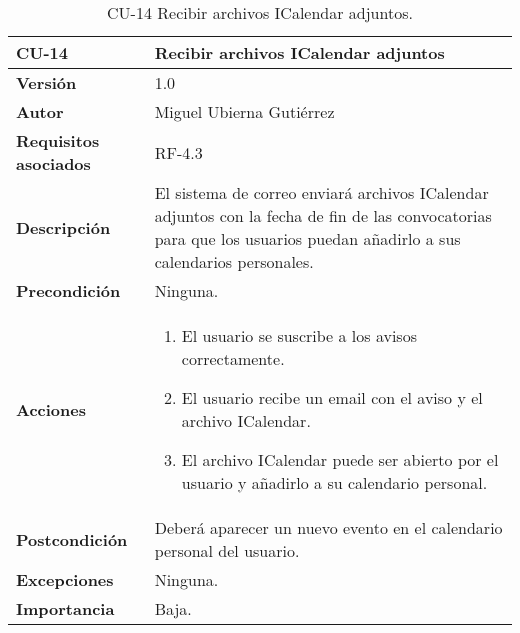 \begin{table}[p]
	\centering
	\begin{tabularx}{\linewidth}{ p{} p{} }
		\toprule
		\textbf{CU-14}    & \textbf{Recibir archivos ICalendar adjuntos}\\
		\toprule
		\textbf{Versión}              & 1.0    \\
		\textbf{Autor}                & Miguel Ubierna Gutiérrez \\
		\textbf{Requisitos asociados} & RF-4.3  \\
		\textbf{Descripción}          & El sistema de correo enviará archivos ICalendar adjuntos con la fecha de fin de las convocatorias para que los usuarios puedan añadirlo a sus calendarios personales.  \\
		\textbf{Precondición}         & Ninguna.\\
		\textbf{Acciones}             &
		\begin{enumerate}
			\def\labelenumi{\arabic{enumi}.}
			\tightlist
			\item El usuario se suscribe a los avisos correctamente.
                \item El usuario recibe un email con el aviso y el archivo ICalendar.
                \item El archivo ICalendar puede ser abierto por el usuario y añadirlo a su calendario personal.
		\end{enumerate}\\
		\textbf{Postcondición}        & Deberá aparecer un nuevo evento en el calendario personal del usuario. \\
		\textbf{Excepciones}          & Ninguna. \\
		\textbf{Importancia}          & Baja.  \\
		\bottomrule
	\end{tabularx}
	\caption{CU-14 Recibir archivos ICalendar adjuntos.}
\end{table}


